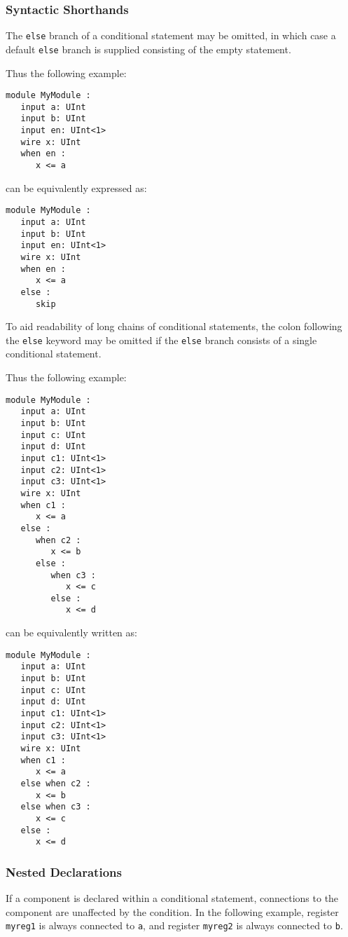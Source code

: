 \documentclass[12pt]{article}
\begin{document}
\subsubsection{Syntactic Shorthands}
The \verb|else| branch of a conditional statement may be omitted, in which case a default \verb|else| branch is supplied consisting of the empty statement.

Thus the following example:

\begin{verbatim}
module MyModule :
   input a: UInt
   input b: UInt
   input en: UInt<1>
   wire x: UInt
   when en :
      x <= a
\end{verbatim}

can be equivalently expressed as:

\begin{verbatim}
module MyModule :
   input a: UInt
   input b: UInt
   input en: UInt<1>
   wire x: UInt
   when en :
      x <= a
   else : 
      skip   
\end{verbatim}

To aid readability of long chains of conditional statements, the colon following the \verb|else| keyword may be omitted if the \verb|else| branch consists of a single conditional statement.

Thus the following example:

\begin{verbatim}
module MyModule :
   input a: UInt
   input b: UInt
   input c: UInt
   input d: UInt
   input c1: UInt<1>
   input c2: UInt<1>
   input c3: UInt<1>
   wire x: UInt
   when c1 :
      x <= a
   else :
      when c2 :
         x <= b
      else :
         when c3 :
            x <= c  
         else :
            x <= d       
\end{verbatim}

can be equivalently written as:

\begin{verbatim}
module MyModule :
   input a: UInt
   input b: UInt
   input c: UInt
   input d: UInt
   input c1: UInt<1>
   input c2: UInt<1>
   input c3: UInt<1>
   wire x: UInt
   when c1 :
      x <= a
   else when c2 :
      x <= b
   else when c3 :
      x <= c  
   else :
      x <= d       
\end{verbatim}

\subsubsection{Nested Declarations}
If a component is declared within a conditional statement, connections to the component are unaffected by the condition. In the following example, register \verb|myreg1| is always connected to \verb|a|, and register \verb|myreg2| is always connected to \verb|b|.
\end{document}
